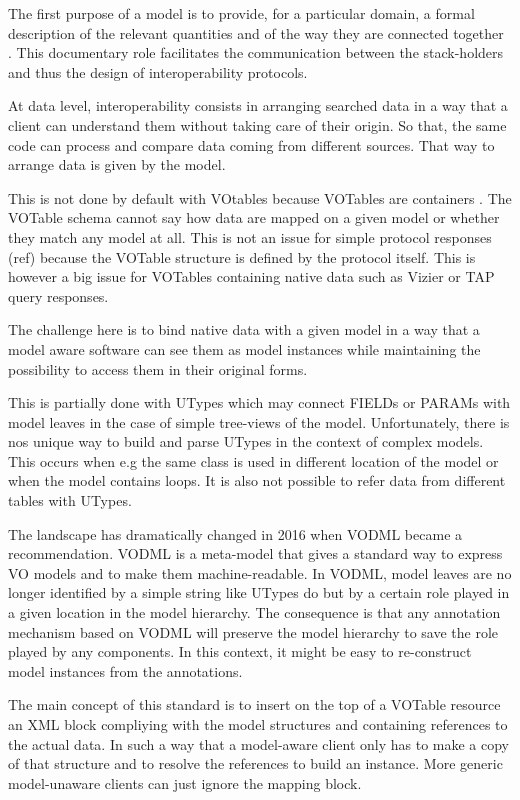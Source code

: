 
The first purpose of a model is to provide, for a particular domain, a formal description of the relevant quantities and of the way they are connected together .
This documentary role facilitates the communication between the stack-holders and thus the design of interoperability protocols. 

At data level, interoperability consists in arranging searched data in a way that a client can understand them without taking care of their origin. 
So that, the same code can process and compare data coming from different sources.  That way to arrange data is given by the model.

This is not done by default with VOtables because VOTables are containers \citep{2019ivoa.spec.1021O}. 
The VOTable schema cannot say how data are mapped on a given model or whether they match any model at all. 
This is not an issue for simple protocol responses (ref) because the VOTable structure is defined by the protocol itself. 
This is however a big issue for VOTables containing native data such as Vizier  or TAP query responses.

The challenge here is to bind native data with a given model in a way that a model aware software can see them as 
model instances while maintaining the possibility to access them in their original forms.

This is partially done with UTypes which may connect FIELDs or PARAMs with model leaves in the case of simple tree-views of the model. 
Unfortunately, there is nos unique  way to build and parse UTypes in the context of complex models. 
This occurs when e.g the same class is used in different location of the model or when the model contains loops. 
It is also not possible to refer data from different tables with  UTypes.

The landscape has dramatically changed in 2016 when VODML \citep{2018ivoa.spec.0910L} became a recommendation. 
VODML is a meta-model that gives a standard way to express VO models and to make them machine-readable.
In VODML, model leaves are no longer identified by a simple string like UTypes do but by a certain role played in a given location in the model hierarchy.
The consequence is that any annotation mechanism based on VODML will preserve the model hierarchy to save the role played by any components. 
In this context, it might be easy to re-construct model instances from the annotations. 

The main concept of this standard is to insert on the  top of a VOTable resource an XML block compliying with the 
model structures and containing references to the actual data.
In such a way that a model-aware client only has to make a copy of that structure and to resolve the references  
to build an instance. More generic model-unaware clients can just ignore the mapping block. 

